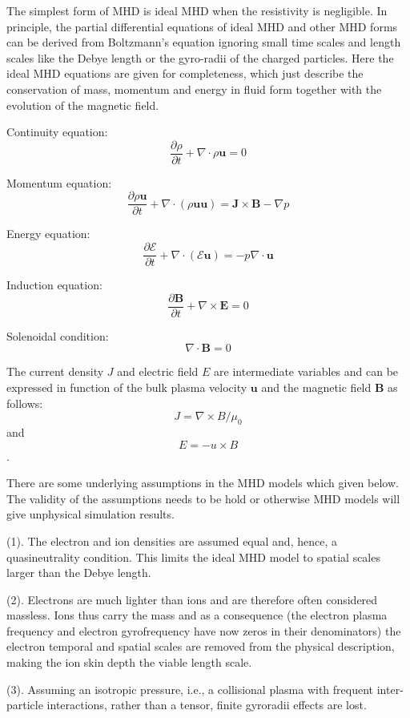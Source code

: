 The simplest form of MHD is ideal MHD when the resistivity is negligible. In principle, the partial differential equations of ideal MHD and other MHD forms can be derived from Boltzmann's equation ignoring small time scales and length scales like the Debye length or the gyro-radii of the charged particles. Here the ideal MHD equations are given for completeness, which just describe the conservation of mass, momentum and energy in fluid form together with the evolution of the magnetic field. 

Continuity equation: $$\frac{\partial \rho}{\partial t}+\nabla \cdot \rho \boldsymbol{u}=0$$

Momentum equation: $$\frac{\partial \rho \boldsymbol{u}}{\partial t}+\nabla \cdot(\rho \boldsymbol{u u})=\boldsymbol{J} \times \boldsymbol{B}-\nabla p$$

Energy equation: $$\frac{\partial \mathcal{E}}{\partial t}+\nabla \cdot(\mathcal{E} \boldsymbol{u})=-p \nabla \cdot \boldsymbol{u}$$

Induction equation: $$\frac{\partial \boldsymbol{B}}{\partial t}+\nabla \times \boldsymbol{E}=0$$

Solenoidal condition: $$\nabla \cdot \boldsymbol{B}=0$$

The current density $J$ and electric field $E$ are intermediate variables and can be expressed in function of the bulk plasma velocity $\boldsymbol{u}$ and the magnetic field $\boldsymbol{B}$ as follows: $$J = ∇ \times B/μ_0$$ and $$E = -u \times B$$.

There are some underlying assumptions in the MHD models which given below. The validity of the assumptions needs to be hold or otherwise MHD models will give unphysical simulation results.

(1). The electron and ion densities are assumed equal and, hence, a quasineutrality condition. This limits the ideal MHD model to spatial scales larger than the Debye length.

(2). Electrons are much lighter than ions and are therefore often considered massless. Ions thus carry the mass and as a consequence (the electron plasma frequency and electron gyrofrequency have now zeros in their denominators) the electron temporal and spatial scales are removed from the physical description, making the ion skin depth the viable length scale.

(3). Assuming an isotropic pressure, i.e., a collisional plasma with frequent inter-particle interactions, rather than a tensor, finite gyroradii effects are lost.

